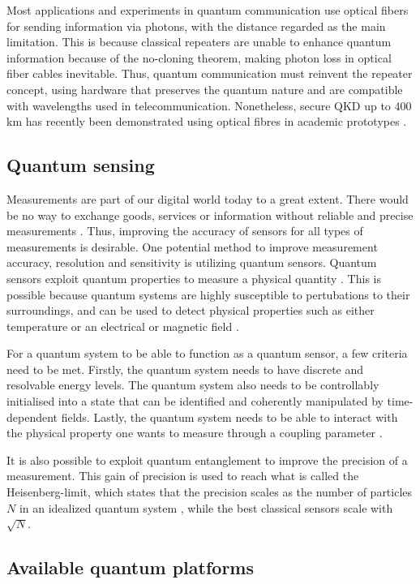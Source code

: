 Most applications and experiments in quantum communication use optical fibers for sending information via photons, with the distance regarded as the main limitation. This is because classical repeaters are unable to enhance quantum information because of the no-cloning theorem, making photon loss in optical fiber cables inevitable. Thus, quantum communication must reinvent the repeater concept, using hardware that preserves the quantum nature \cite{Acin2018} and are compatible with wavelengths used in telecommunication. Nonetheless, secure QKD up to $400$ km has recently been demonstrated using optical fibres in academic prototypes \cite{Boaron2018}.

\subsection{Quantum sensing}

Measurements are part of our digital world today to a great extent. There would be no way to exchange goods, services or information without reliable and precise measurements \cite{Acin2018}. Thus, improving the accuracy of sensors for all types of measurements is desirable. One potential method to improve measurement accuracy, resolution and sensitivity is utilizing quantum sensors. Quantum sensors exploit quantum properties to measure a physical quantity \cite{Degen2017}. This is possible because quantum systems are highly susceptible to pertubations to their surroundings, and can be used to detect physical properties such as either temperature or an electrical or magnetic field \cite{Degen2017}.

For a quantum system to be able to function as a quantum sensor, a few criteria need to be met.  Firstly, the quantum system needs to have discrete and resolvable energy levels. The quantum system also needs to be controllably initialised into a state that can be identified and coherently manipulated by time-dependent fields. Lastly, the quantum system needs to be able to interact with the physical property one wants to measure through a coupling parameter \cite{Degen2017}.

It is also possible to exploit quantum entanglement to improve the precision of a measurement. This gain of precision is used to reach what is called the Heisenberg-limit, which states that the precision scales as the number of particles $N$ in an idealized quantum system \cite{Degen2017, Acin2018}, while the best classical sensors scale with $\sqrt{N}$.

\subsection{Available quantum platforms}

